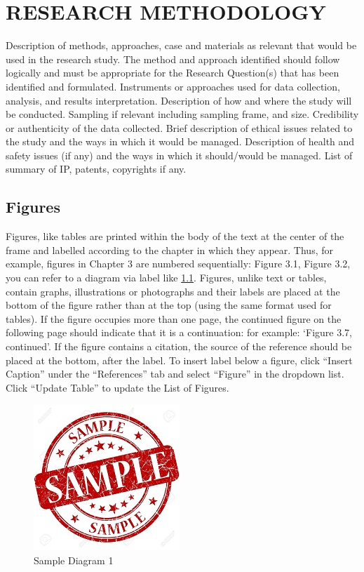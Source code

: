 \chapter{RESEARCH METHODOLOGY}\thispagestyle{EmptyHeader}
\label{chp:3}
Description of methods, approaches, case and materials as relevant that would be used in the research study. The method and approach identified should follow logically and must be appropriate for the Research Question(s) that has been identified and formulated. Instruments or approaches used for data collection, analysis, and results interpretation. Description of how and where the study will be conducted.  Sampling if relevant including sampling frame, and size. Credibility or authenticity of the data collected. Brief description of ethical issues related to the study and the ways in which it would be managed. Description of health and safety issues (if any) and the ways in which it should/would be managed. List of summary of IP, patents, copyrights if any.
\section{Figures}

Figures, like tables are printed within the body of the text at the center of the frame and labelled according to the chapter in which they appear. Thus, for example, figures in Chapter 3 are numbered sequentially: Figure 3.1, Figure 3.2, you can refer to a diagram via label like \ref{diag:sample}.
Figures, unlike text or tables, contain graphs, illustrations or photographs and their labels are placed at the bottom of the figure rather than at the top (using the same format used for tables). If the figure occupies more than one page, the continued figure on the following page should indicate that it is a continuation: for example: ‘Figure 3.7, continued’. If the figure contains a citation, the source of the reference should be placed at the bottom, after the label.
To insert label below a figure, click “Insert Caption” under the “References” tab and select “Figure” in the dropdown list. Click “Update Table” to update the List of Figures.

\begin{figure}[ht]
	\centering
	\includegraphics{images/blockdiagram.jpg}
	\caption{Sample Diagram 1}
	\label{diag:sample}
\end{figure}




